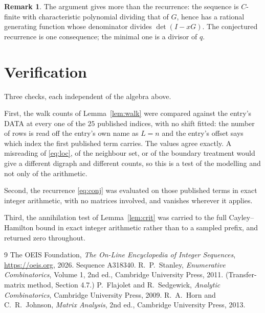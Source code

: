\documentclass[11pt,a4paper]{article}
\theoremstyle{plain}
\theoremstyle{definition}
\newtheorem{remark}[theorem]{Remark}
\begin{document}
\begin{remark}
The argument gives more than the recurrence: the sequence is $C$-finite with characteristic
polynomial dividing that of $G$, hence has a rational generating function whose denominator
divides $\det(I-xG)$. The conjectured recurrence is one consequence; the minimal one is a
divisor of $q$.
\end{remark}

\section{Verification}

Three checks, each independent of the algebra above.

First, the walk counts of Lemma~\ref{lem:walk} were compared against the entry's DATA at
every one of the $25$ published indices, with no shift fitted: the number of rows is
read off the entry's own name as $L=n$ and the entry's offset says which index the first
published term carries. The values agree exactly. A misreading of \eqref{eq:loc}, of the
neighbour set, or of the boundary treatment would give a different digraph and different
counts, so this is a test of the modelling and not only of the arithmetic.

Second, the recurrence \eqref{eq:conj} was evaluated on those published terms in exact
integer arithmetic, with no matrices involved, and vanishes wherever it applies.

Third, the annihilation test of Lemma~\ref{lem:crit} was carried to the full
Cayley--Hamilton bound in exact integer arithmetic rather than to a sampled prefix, and
returned zero throughout.

\begin{thebibliography}{9}
 The OEIS Foundation, \emph{The On-Line Encyclopedia of Integer
Sequences}, \url{https://oeis.org}, 2026. Sequence A318340.
 R.~P.~Stanley, \emph{Enumerative Combinatorics}, Volume 1, 2nd ed.,
Cambridge University Press, 2011. (Transfer-matrix method, Section 4.7.)
 P.~Flajolet and R.~Sedgewick, \emph{Analytic Combinatorics}, Cambridge
University Press, 2009.
 R.~A.~Horn and C.~R.~Johnson, \emph{Matrix Analysis}, 2nd ed., Cambridge
University Press, 2013.
\end{thebibliography}
\end{document}
